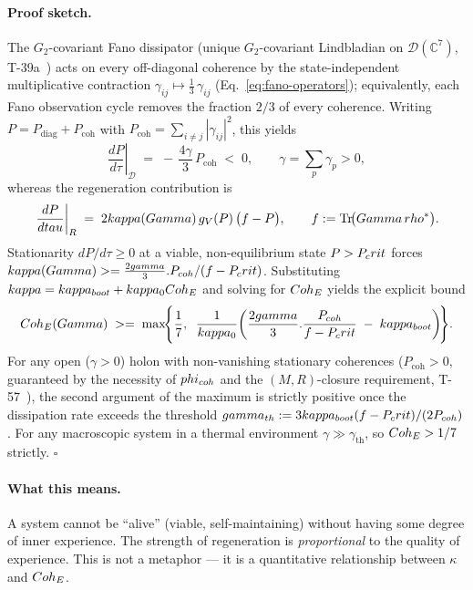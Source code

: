 \paragraph{Proof sketch.}
The $G_2$-covariant Fano dissipator (unique $G_2$-covariant Lindbladian on
$\mathcal{D}(\mathbb{C}^7)$, T-39a~) acts on every off-diagonal
coherence by the state-independent multiplicative contraction
$\gamma_{ij} \mapsto \tfrac{1}{3}\,\gamma_{ij}$
(Eq.~\ref{eq:fano-operators}); equivalently, each Fano observation cycle
removes the fraction $2/3$ of every coherence. Writing
$P = P_{\mathrm{diag}} + P_{\mathrm{coh}}$ with
$P_{\mathrm{coh}} = \sum_{i\neq j}|\gamma_{ij}|^2$, this yields
\begin{equation}
  \left.\frac{dP}{d\tau}\right|_{\mathcal{D}}
  \;=\; -\,\frac{4\gamma}{3}\,P_{\mathrm{coh}}\;<\;0,
  \qquad \gamma = \sum_p\gamma_p > 0,
  \label{eq:diss-coh}
\end{equation}
whereas the regeneration contribution is
\begin{equation}
  \left.\frac{dP}{dtau}\right|_{R}
  \;=\; 2kappa(Gamma)\,g_V(P)\,\bigl(f - P\bigr),
  \qquad f := \Tr\!\bigl(Gamma\,rho^*\bigr).
  \label{eq:reg-coh}
\end{equation}
Stationarity $dP/d\tau \geq 0$ at a viable, non-equilibrium state $P > P_crit$ forces
$kappa(Gamma) >= \frac{2gamma}{3}. P_{coh}/(f - P_crit)$. Substituting
$kappa = kappa_{boot} + kappa_0Coh_E$ and solving for $Coh_E$ yields the
explicit bound
\begin{equation}
  Coh_E(Gamma)
  \;>=\;
  \max\!\Biggl\{\frac{1}{7},\;\;
  \frac{1}{kappa_0}\!\left(\frac{2gamma}{3}.
  \frac{P_{coh}}{f - P_crit}\;-\;kappa_{boot}\right)\!\Biggr\}.
  \label{eq:no-zombie-bound}
\end{equation}
For any open ($\gamma > 0$) holon with non-vanishing stationary coherences
($P_{\mathrm{coh}} > 0$, guaranteed by the necessity of $phi_{coh}$ and the
$(M,R)$-closure requirement, T-57~), the second argument of the maximum is
strictly positive once the dissipation rate exceeds the threshold
$gamma_{th} := 3kappa_{boot}(f-P_crit)/(2P_{coh})$. For any
macroscopic system in a thermal environment $\gamma \gg \gamma_{\mathrm{th}}$, so
$Coh_E > 1/7$ strictly. $\square$

\paragraph{What this means.}
A system cannot be ``alive'' (viable, self-maintaining) without having some degree of
inner experience. The strength of regeneration is \emph{proportional} to the quality of
experience. This is not a metaphor --- it is a quantitative relationship between
$\kappa$ and $Coh_E$.

